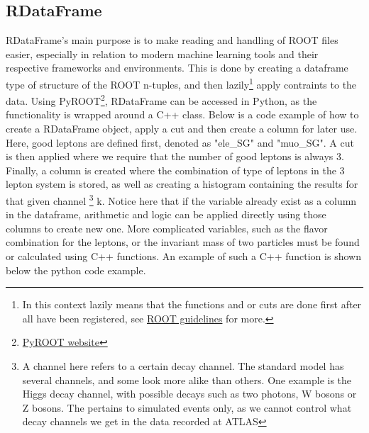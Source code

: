 \subsection*{RDataFrame}
RDataFrame's main purpose is to make reading and handling of ROOT files easier, especially in relation to modern machine learning tools and their 
respective frameworks and environments. This is done by creating a dataframe type of structure of the ROOT n-tuples, and then 
lazily\footnote{In this context lazily means that the functions and or cuts are done first after all have been registered, see \href{https://root.cern/doc/master/classROOT_1_1RDataFrame.html}{ROOT guidelines} for more.} 
apply contraints to the data. Using PyROOT\footnote{\href{https://root.cern/manual/python/}{PyROOT website}}, RDataFrame can be accessed in Python, as the functionality is wrapped around a C++ class. Below is a code example of how
to create a RDataFrame object, apply a cut and then create a column for later use. Here, good leptons are defined first, denoted as "ele\_SG" and "muo\_SG". 
A cut is then applied where we require that the number of good leptons is always 3. Finally, a column is created where the combination of type of leptons 
in the 3 lepton system is stored, as well as creating a histogram containing the results for that given channel
\footnote{A channel here refers to a certain decay channel. The standard model has several channels, and some look more alike than others. One example is 
the Higgs decay channel, with possible decays such as two photons, W bosons or Z bosons. The pertains to simulated events only, as we cannot control what decay channels we get in the data recorded at ATLAS} 
k. Notice here that if the variable already exist as a column in the dataframe, arithmetic and logic can be applied directly using those 
columns to create new one. More complicated variables, such as the flavor combination for the leptons, or the invariant mass of two particles must be 
found or calculated using C++ functions. An example of such a C++ function is shown below the python code example. 


